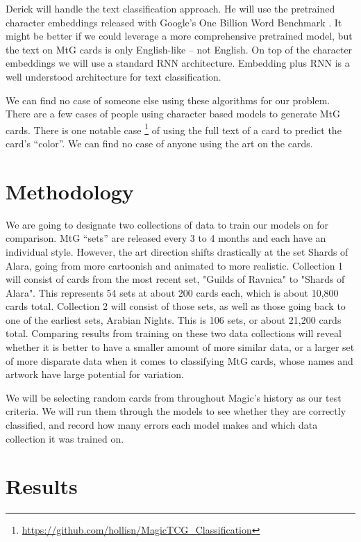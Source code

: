 \documentclass{article}
\begin{document}
Derick will handle the text classification approach.
He will use the pretrained character embeddings
released with Google's One Billion Word Benchmark
\cite{one-billion-words}.
It might be better if we could leverage a more comprehensive pretrained model,
but the text on MtG cards is only English-like -- not English.
On top of the character embeddings
we will use a standard RNN architecture.
Embedding plus RNN is a well understood architecture for text classification.

We can find no case of someone else using these algorithms for our problem.
There are a few cases of people using character based models
to generate MtG cards.
There is one notable case
\footnote{\url{https://github.com/hollisn/MagicTCG_Classification}}
of using the full text of a card to predict the card's ``color''.
We can find no case of anyone using the art on the cards.

\section*{Methodology}

We are going to designate two collections of data to train
our models on for comparison. MtG ``sets'' are released every
3 to 4 months and each have an individual style. However, the art
direction shifts drastically at the set Shards of Alara,
going from more cartoonish and animated to more realistic.
Collection 1 will consist of cards from the most recent set,
"Guilds of Ravnica" to "Shards of Alara". This represents 54 sets
at about 200 cards each, which is about 10,800 cards total.
Collection 2 will consist of those sets, as well as
those going back to one of the earliest sets, Arabian Nights.
This is 106 sets, or about 21,200 cards total.
Comparing results from training on these two data collections will
reveal whether it is better to have a smaller amount of more similar
data, or a larger set of more disparate data when it comes to classifying
MtG cards, whose names and artwork have large potential for variation.

We will be selecting random cards from throughout Magic's history as our
test criteria. We will run them through the models to see whether they are
correctly classified, and record how many errors each model makes and which
data collection it was trained on.

\section*{Results}
\end{document}
